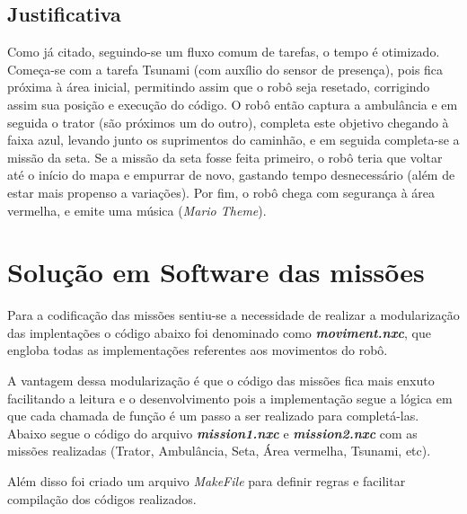 \section{Justificativa}
Como já citado, seguindo-se um fluxo comum de tarefas, o tempo é otimizado. Começa-se com a tarefa Tsunami (com auxílio do sensor de presença), pois fica próxima à área inicial, permitindo assim que o robô seja resetado, corrigindo assim sua posição e execução do código. O robô então captura a ambulância e em seguida o trator (são próximos um do outro), completa este objetivo chegando à faixa azul, levando junto os suprimentos do caminhão, e em seguida completa-se a missão da seta. Se a missão da seta fosse feita primeiro, o robô teria que voltar até o início do mapa e empurrar de novo, gastando tempo desnecessário (além de estar mais propenso a variações). Por fim, o robô chega com segurança à área vermelha, e emite uma música (\emph{Mario Theme}).

\chapter{Solução em Software das missões}

Para a codificação das missões sentiu-se a necessidade de realizar a modularização das implentações o código abaixo foi denominado como \textbf{\textit{moviment.nxc}}, que engloba todas as implementações referentes aos movimentos do robô.



A vantagem dessa modularização é que o código das missões fica mais enxuto facilitando a leitura e o desenvolvimento pois a implementação segue a lógica em que cada chamada de função é um passo a ser realizado para completá-las. Abaixo segue o código do arquivo \textbf{\textit{mission1.nxc}} e \textbf{\textit{mission2.nxc}} com as missões realizadas (Trator, Ambulância, Seta, Área vermelha, Tsunami, etc).





Além disso foi criado um arquivo \textit{MakeFile} para definir regras e facilitar compilação dos códigos realizados.



